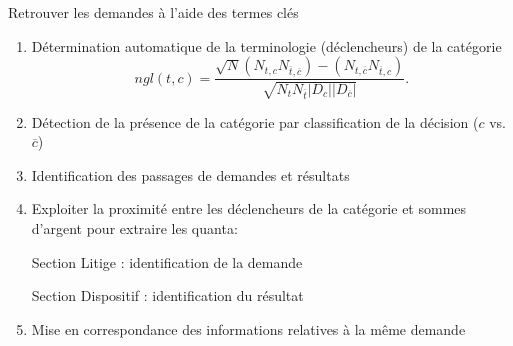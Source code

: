 \begin{frame}[c]{Retrouver les demandes à l'aide des termes clés}
	\begin{enumerate} \scriptsize
		\item Détermination automatique de la terminologie (déclencheurs) de la catégorie \[ngl(t,c) = \frac{\sqrt{N} (N_{t,c} N_{\overline{t},\overline{c}}) - (N_{t,\overline{c}} N_{\overline{t},c})}{\sqrt{N_t N_{\overline{t}} \vert D_c \vert \vert D_{\overline{c}} \vert }}.\]
		\item Détection de la présence de la catégorie par classification de la décision ($c$ vs. $\overline{c}$)
		\item Identification des passages de demandes et résultats 
		\item Exploiter la proximité entre les déclencheurs de la catégorie  et sommes d’argent pour extraire les quanta:
		
		Section Litige : identification de la demande
		
	
	Section Dispositif : identification du résultat
		\item Mise en correspondance des informations relatives à la même demande
	\end{enumerate}
	
\end{frame}
